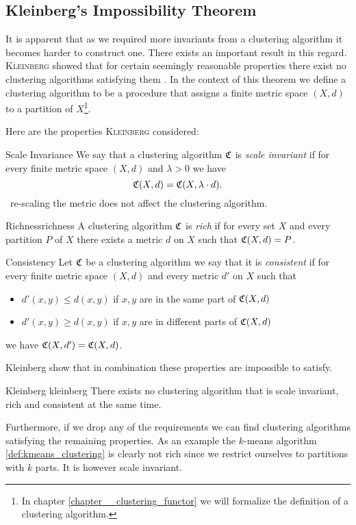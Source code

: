 \subsection{Kleinberg's Impossibility Theorem}
It is apparent that as we required more invariants from a clustering algorithm it becomes harder to construct one.
There exists an important result in this regard.
\textsc{Kleinberg} showed that for certain seemingly reasonable properties there exist no clustering algorithms satisfying them \cite{Kleinberg2002}.
In the context of this theorem we define a clustering algorithm to be a procedure that assigns a finite metric space $(X,d)$ to a partition of $X$\footnote{In chapter \ref{chapter__clustering_functor} we will formalize the definition of a clustering algorithm.}.

Here are the properties \textsc{Kleinberg} considered:

\begin{definition}{Scale Invariance}{}
We say that a clustering algorithm $\mathfrak{C}$ is \emph{scale invariant} if for every finite metric space $(X,d)$ and $\lambda > 0$ we have
$$
\mathfrak{C}(X,d) = \mathfrak{C}(X, \lambda \cdot d).
$$
\Ie\ re-scaling the metric does not affect the clustering algorithm.
\end{definition}

\begin{definition}{Richness}{richness}
A clustering algorithm $\mathfrak{C}$ is \emph{rich} if for every set $X$ and every partition $P$ of $X$ there exists a metric $d$ on $X$ such that $\mathfrak{C}(X,d) = P$.
\end{definition}

\begin{definition}{Consistency}{}
Let $\mathfrak{C}$ be a clustering algorithm we say that it is \emph{consistent} if for every finite metric space $(X,d)$ and every metric $d'$ on $X$ such that
\begin{itemize}
    \item $d'(x,y) \leq d(x,y)$ if $x,y$ are in the same part of $\mathfrak{C}(X,d)$
    \item $d'(x,y) \geq d(x,y)$ if $x,y$ are in different parts of $\mathfrak{C}(X,d)$
\end{itemize}
we have $\mathfrak{C}(X,d') = \mathfrak{C}(X,d)$.
\end{definition}

Kleinberg show that in combination these properties are impossible to satisfy.

\begin{theorem}{Kleinberg \cite[Thm.~2.1]{Kleinberg2002}}{kleinberg}
There exists no clustering algorithm that is scale invariant, rich and consistent at the same time.
\end{theorem}

Furthermore, if we drop any of the requirements we can find clustering algorithms satisfying the remaining properties. As an example the $k$-means algorithm \ref{def:kmeans_clustering} is clearly not rich since we restrict ourselves to partitions with $k$ parts. It is however scale invariant.

